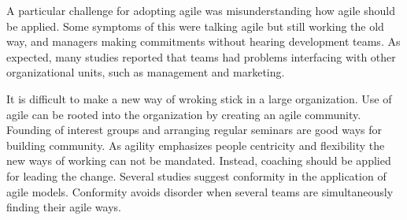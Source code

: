 \documentclass[lnbip]{svmultln}
\begin{document}
A particular challenge for adopting agile was misunderstanding how agile should
be applied. Some symptoms of this were talking agile but still working the old
way, and managers making commitments without hearing development teams.
As expected, many studies reported that teams had problems interfacing with
other organizational units, such as management and marketing.

It is difficult to make a new way of wroking stick in a large organization.
Use of agile can be rooted into the organization by creating an agile community.
Founding of interest groups and arranging regular seminars are good ways for
building community. As agility emphasizes people centricity and flexibility the
new ways of working can not be mandated. Instead, coaching should be applied for
leading the change. Several studies suggest conformity in the application of
agile models. Conformity avoids disorder when several teams are simultaneously
finding their agile ways.
\end{document}
